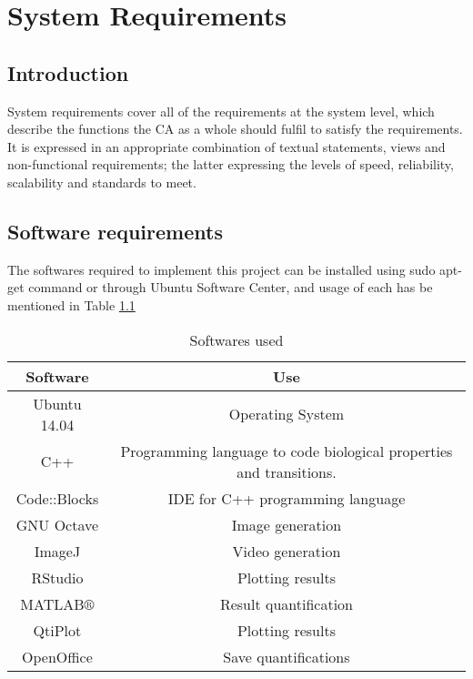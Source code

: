 \chapter{System Requirements}
\section{Introduction}
System requirements cover all of the requirements at the system level, which describe the functions the CA as a whole should fulfil to satisfy the requirements. 
It is expressed in an appropriate combination of textual statements, views and non-functional requirements; 
the latter expressing the levels of speed, reliability, scalability and standards to meet.
\section{Software requirements}
The softwares required to implement this project can be installed using sudo apt-get command or through Ubuntu Software Center, 
and usage of each has be mentioned in Table \ref{Tbl_softwares_used}
  \begin{table}[H]
	\begin{center}
		\begin{tabular}{ |c | c | }
			\hline
			\textbf{Software} & \textbf{Use}  \\ \hline
			  Ubuntu 14.04	 & 	Operating System	\\  \hline
			  C++ 		 &      Programming language to code biological properties and transitions.\\  \hline
			  Code::Blocks	 & 	IDE for C++ programming language	\\  \hline
			  GNU Octave	 & 	Image generation	\\  \hline
			  ImageJ	 & 	Video generation	\\  \hline
			  RStudio	 & 	Plotting results	\\  \hline
			  MATLAB$\circledR$	 & 	Result quantification	\\  \hline
			  QtiPlot	 & 	Plotting results	\\  \hline
			  OpenOffice	 & 	Save quantifications	\\  \hline
		\end{tabular}
		\caption{Softwares used}
		\label{Tbl_softwares_used}
	\end{center}
\end{table}


